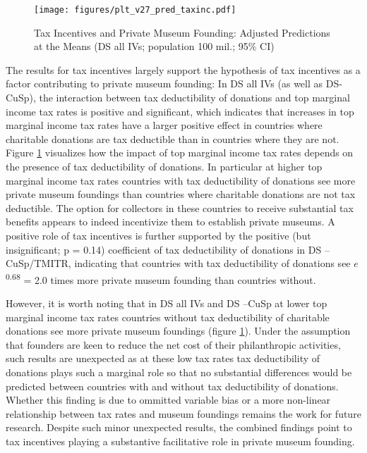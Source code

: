\documentclass[11pt]{article}
\begin{document}
\begin{figure}[htbp]
\centering
\texttt{[image: figures/plt\_v27\_pred\_taxinc.pdf]}
\caption{\label{fig:pred_taxinc}Tax Incentives and Private Museum Founding: Adjusted Predictions at the Means (DS all IVs; population 100 mil.; 95\% CI)}
\end{figure}

The results for tax incentives largely support the hypothesis of tax incentives as a factor contributing to private museum founding:
In DS all IVs (as well as DS-CuSp), the interaction between tax deductibility of donations and top marginal income tax rates is positive and significant, which indicates that increases in top marginal income tax rates have a larger positive effect in countries where charitable donations are tax deductible than in countries where they are not.
Figure \ref{fig:pred_taxinc} visualizes how the impact of top marginal income tax rates depends on the presence of tax deductibility of donations.
In particular at higher top marginal income tax rates countries with tax deductibility of donations see more private museum foundings than countries where charitable donations are not tax deductible.
The option for collectors in these countries to receive substantial tax benefits appears to indeed incentivize them to establish private museums.
A positive role of tax incentives is further supported by the positive (but insignificant; p = 0.14) coefficient of tax deductibility of donations in DS --CuSp/TMITR, indicating that countries with tax deductibility of donations see \(e\)\textsuperscript{0.68} = 2.0 times more private museum founding than countries without. 



However, it is worth noting that in DS all IVs and DS --CuSp at lower top marginal income tax rates countries without tax deductibility of charitable donations see more private museum foundings (figure \ref{fig:pred_taxinc}).
Under the assumption that founders are keen to reduce the net cost of their philanthropic activities, such results are unexpected as at these low tax rates tax deductibility of donations plays such a marginal role so that no substantial differences would be predicted between countries with and without tax deductibility of donations.  
Whether this finding is due to ommitted variable bias or a more non-linear relationship between tax rates and museum foundings remains the work for future research.
Despite such minor unexpected results, the combined findings point to tax incentives playing a substantive facilitative role in private museum founding. 
\end{document}
